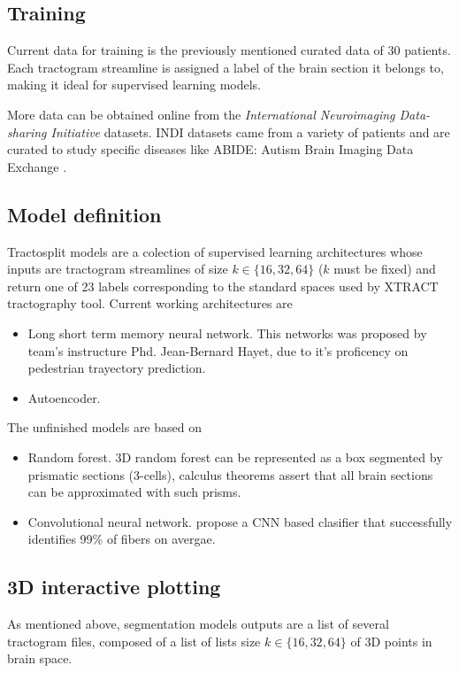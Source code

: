 \documentclass[conference]{IEEEtran}
\begin{document}
\subsection{Training}
Current data for training is the previously mentioned curated data of 30 patients. Each tractogram streamline is assigned a label of the brain section it belongs to, making it ideal for supervised learning models.

More data can be obtained online from the \textit{International Neuroimaging Data-sharing Initiative} \cite{b3} datasets. INDI datasets came from a variety of patients and are curated to study specific diseases like ABIDE: Autism Brain Imaging Data Exchange \cite{b4}.

\subsection{Model definition}
Tractosplit models are a colection of supervised learning architectures whose inputs are tractogram streamlines of size $k\in\{16, 32, 64\}$ ($k$ must be fixed) and return one of 23 labels corresponding to the standard spaces used by XTRACT \cite{b4} tractography tool. Current working architectures are

\begin{itemize}
    \item Long short term memory neural network. This networks was proposed by team's instructure Phd. Jean-Bernard Hayet, due to it's proficency on pedestrian trayectory prediction.
    \item Autoencoder.
\end{itemize}
The unfinished models are based on
\begin{itemize}
    \item Random forest. 3D random forest can be represented as a box segmented by prismatic sections (3-cells), calculus theorems assert that all brain sections can be approximated with such prisms.
    \item Convolutional neural network. \cite{b5} propose a CNN based clasifier that successfully identifies 99\% of fibers on avergae.
\end{itemize}

\subsection{3D interactive plotting}
As mentioned above, segmentation models outputs are a list of several tractogram files, composed of a list of lists size $k\in \{16, 32, 64\}$ of 3D points in brain space.
\end{document}

